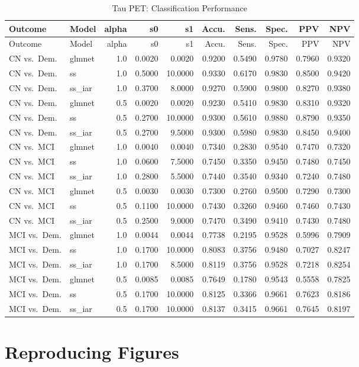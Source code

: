 \documentclass[
]{article}
\begin{document}
\begin{longtable}[]{@{}llrrrrrrrr@{}}
\caption{Tau PET: Classification Performance}\tabularnewline
\toprule
Outcome & Model & alpha & s0 & s1 & Accu. & Sens. & Spec. & PPV &
NPV\tabularnewline
\midrule
\endfirsthead
\toprule
Outcome & Model & alpha & s0 & s1 & Accu. & Sens. & Spec. & PPV &
NPV\tabularnewline
\midrule
\endhead
CN vs.~Dem. & glmnet & 1.0 & 0.0020 & 0.0020 & 0.9200 & 0.5490 & 0.9780
& 0.7960 & 0.9320\tabularnewline
CN vs.~Dem. & ss & 1.0 & 0.5000 & 10.0000 & 0.9330 & 0.6170 & 0.9830 &
0.8500 & 0.9420\tabularnewline
CN vs.~Dem. & ss\_iar & 1.0 & 0.3700 & 8.0000 & 0.9270 & 0.5900 & 0.9800
& 0.8270 & 0.9380\tabularnewline
CN vs.~Dem. & glmnet & 0.5 & 0.0020 & 0.0020 & 0.9230 & 0.5410 & 0.9830
& 0.8310 & 0.9320\tabularnewline
CN vs.~Dem. & ss & 0.5 & 0.2700 & 10.0000 & 0.9300 & 0.5610 & 0.9880 &
0.8790 & 0.9350\tabularnewline
CN vs.~Dem. & ss\_iar & 0.5 & 0.2700 & 9.5000 & 0.9300 & 0.5980 & 0.9830
& 0.8450 & 0.9400\tabularnewline
CN vs.~MCI & glmnet & 1.0 & 0.0040 & 0.0040 & 0.7340 & 0.2830 & 0.9540 &
0.7470 & 0.7320\tabularnewline
CN vs.~MCI & ss & 1.0 & 0.0600 & 7.5000 & 0.7450 & 0.3350 & 0.9450 &
0.7480 & 0.7450\tabularnewline
CN vs.~MCI & ss\_iar & 1.0 & 0.2800 & 5.5000 & 0.7440 & 0.3540 & 0.9340
& 0.7240 & 0.7480\tabularnewline
CN vs.~MCI & glmnet & 0.5 & 0.0030 & 0.0030 & 0.7300 & 0.2760 & 0.9500 &
0.7290 & 0.7300\tabularnewline
CN vs.~MCI & ss & 0.5 & 0.1100 & 10.0000 & 0.7430 & 0.3260 & 0.9460 &
0.7460 & 0.7430\tabularnewline
CN vs.~MCI & ss\_iar & 0.5 & 0.2500 & 9.0000 & 0.7470 & 0.3490 & 0.9410
& 0.7430 & 0.7480\tabularnewline
MCI vs.~Dem. & glmnet & 1.0 & 0.0044 & 0.0044 & 0.7738 & 0.2195 & 0.9528
& 0.5996 & 0.7909\tabularnewline
MCI vs.~Dem. & ss & 1.0 & 0.1700 & 10.0000 & 0.8083 & 0.3756 & 0.9480 &
0.7027 & 0.8247\tabularnewline
MCI vs.~Dem. & ss\_iar & 1.0 & 0.1700 & 8.5000 & 0.8119 & 0.3756 &
0.9528 & 0.7218 & 0.8254\tabularnewline
MCI vs.~Dem. & glmnet & 0.5 & 0.0085 & 0.0085 & 0.7649 & 0.1780 & 0.9543
& 0.5558 & 0.7825\tabularnewline
MCI vs.~Dem. & ss & 0.5 & 0.1700 & 10.0000 & 0.8125 & 0.3366 & 0.9661 &
0.7623 & 0.8186\tabularnewline
MCI vs.~Dem. & ss\_iar & 0.5 & 0.1700 & 10.0000 & 0.8137 & 0.3415 &
0.9661 & 0.7645 & 0.8197\tabularnewline
\bottomrule
\end{longtable}

\hypertarget{reproducing-figures}{%
\section{Reproducing Figures}\label{reproducing-figures}}
\end{document}
